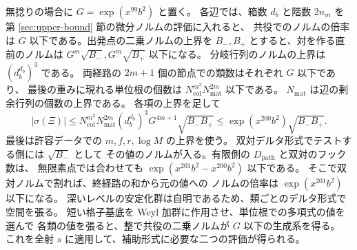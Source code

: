 無捻りの場合に \(G=\exp(x^{99}b^2)\) と置く。
各辺では、箱数 \(d_b\) と階数 \(2n_m\) を
第 \ref{sec:upper-bound} 節の微分ノルムの評価に入れると、
共役でのノルムの倍率は \(G\) 以下である。出発点の二乗ノルムの上界を
\(B_-,B_+\) とすると、対を作る直前のノルムは
\(G^m\sqrt{B_-},G^m\sqrt{B_+}\) 以下になる。
分岐行列のノルムの上界は \((d_b^{d_b})^3\) である。
両経路の \(2m+1\) 個の節点での類数はそれぞれ \(G\) 以下であり、
最後の重みに現れる単位根の個数は
\(N_\mathrm{col}^{m^2}N_\mathrm{mat}^{2m}\) 以下である。
\(N_\mathrm{mat}\) は辺の剰余行列の個数の上界である。
各項の上界を足して
\[
 |\sigma(\Xi)|\le
 N_\mathrm{col}^{m^2}N_\mathrm{mat}^{2m}(d_b^{d_b})^3G^{4m+1}\sqrt{B_-B_+}
 \le\exp(x^{200}b^2)\sqrt{B_-B_+}.
\]
最後は許容データでの \(m,f,r,\log M\) の上界を使う。
双対デルタ形式でテストする側には \(\sqrt{B_-}\) として
その値のノルムが入る。有限側の \(D_\mathrm{path}\) と双対のフック数は、
無限素点では合わせても
\(\exp(x^{201}b^2-x^{200}b^2)\) 以下である。
そこで双対ノルムで割れば、終経路の和から元の値への
ノルムの倍率は \(\exp(x^{201}b^2)\) 以下になる。
深いレベルの安定化群は自明であるため、類ごとのデルタ形式で空間を張る。
短い格子基底を Weyl 加群に作用させ、単位根での多項式の値を選んで
各類の値を張ると、整で共役の二乗ノルムが \(G\) 以下の生成系を得る。
これを全射 \(s\) に適用して、補助形式に必要な二つの評価が得られる。
